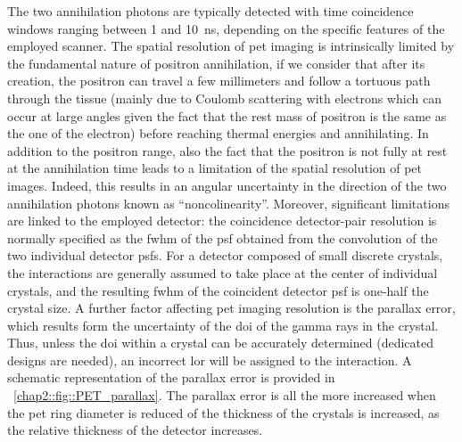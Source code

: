 The two annihilation photons are typically detected with time coincidence windows ranging between 1 and 10~ns, depending on the specific features of the employed scanner. The spatial resolution of \gls{pet} imaging is intrinsically limited by the fundamental nature of positron annihilation, if we consider that after its creation, the positron can travel a few millimeters and follow a tortuous path through the tissue (mainly due to Coulomb scattering with electrons which can occur at large angles given the fact that the rest mass of positron is the same as the one of the electron) before reaching thermal energies and annihilating. In addition to the positron range, also the fact that the positron is not fully at rest at the annihilation time leads to a limitation of the spatial resolution of \gls{pet} images. Indeed, this results in an angular uncertainty in the direction of the two annihilation photons known as \enquote{noncolinearity}. Moreover, significant limitations are linked to the employed detector: the coincidence detector-pair resolution is normally specified as the \gls{fwhm} of the \gls{psf} obtained from the convolution of the two individual detector \glspl{psf}. For a detector composed of small discrete crystals, the interactions are generally assumed to take place at the center of individual crystals, and the resulting \gls{fwhm} of the coincident detector \gls{psf} is one-half the crystal size. A further factor affecting \gls{pet} imaging resolution is the parallax error, which results form the uncertainty of the \gls{doi} of the gamma rays in the crystal. Thus, unless the \gls{doi} within a crystal can be accurately determined (dedicated designs are needed), an incorrect \gls{lor} will be assigned to the interaction. A schematic representation of the parallax error is provided in \figurename~\ref{chap2::fig::PET_parallax}. The parallax error is all the more increased when the \gls{pet} ring diameter is reduced of the thickness of the crystals is increased, as the relative thickness of the detector increases. 

